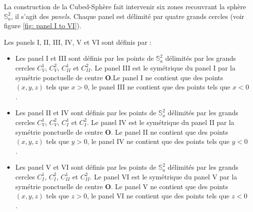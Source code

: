 La construction de la Cubed-Sphère fait intervenir six zones recouvrant la sphère $\mathbb{S}_a^2$, il s'agit des \textit{panels}. Chaque panel est délimité par quatre grands cercles (voir figure \ref{fig: panel I to VI}).

\begin{definition}
Les panels I, II, III, IV, V et VI sont définis par :
\begin{itemize}
\item Les panel I et III sont définis par les points de $\mathbb{S}_a^2$ délimités par les grands cercles $C_V^1$, $C_V^2$, $C_{II}^1$ et $C_{II}^2$. Le panel III est le symétrique du panel I par la symétrie ponctuelle de centre $\mathbf{O}$.Le panel I ne contient que des points $(x,y,z)$ tels que $x>0$, le panel III ne contient que des points tels que $x<0$.
\item Les panel II et IV sont définis par les points de $\mathbb{S}_a^2$ délimités par les grands cercles $C_V^1$, $C_V^2$, $C_{I}^1$ et $C_{I}^2$. Le panel IV est le symétrique du panel II par la symétrie ponctuelle de centre $\mathbf{O}$. Le panel II ne contient que des points $(x,y,z)$ tels que $y>0$, le panel IV ne contient que des points tels que $y<0$.
\item Les panel V et VI sont définis par les points de $\mathbb{S}_a^2$ délimités par les grands cercles $C_I^1$, $C_I^2$, $C_{II}^1$ et $C_{II}^2$. Le panel VI est le symétrique du panel V par la symétrie ponctuelle de centre $\mathbf{O}$. Le panel V ne contient que des points $(x,y,z)$ tels que $z>0$, le panel VI ne contient que des points tels que $z<0$.
\end{itemize}
\end{definition}






